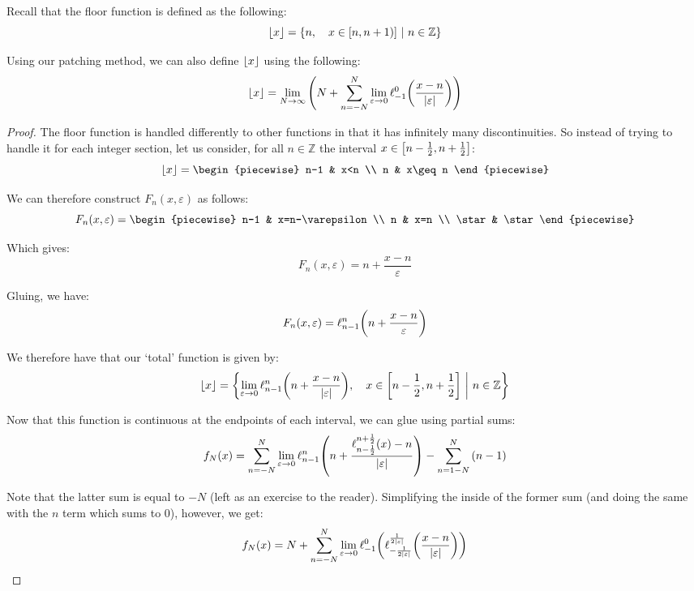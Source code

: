 \begin{example}
    Recall that the floor function is defined as the following:
    $$
        \floor{x} = \pwobj{n}{x\in[n,n+1)]}{n\in\mathbb{Z}}
    $$

    Using our patching method, we can also define $\floor{x}$ using the following:
    $$
        \floor{x} = \lim_{N\to\infty}{\paren*{N+\sum_{n=-N}^{N}{\lim_{\varepsilon\to0}{\ell_{-1}^{0}\paren*{\frac{x-n}{\abs{\varepsilon}}}}}}}
    $$

    \begin{proof}
        The floor function is handled differently to other functions in that it has infinitely many discontinuities. So instead of trying to handle it for each integer section, let us consider, for all $n\in\mathbb{Z}$ the interval $x\in\brak*{n-\frac{1}{2},n+\frac{1}{2}}$:
        $$
            \floor{x} = \begin{piecewise}
                n-1 & x<n \\
                n & x\geq n
            \end{piecewise}
        $$

        We can therefore construct $F_n(x,\varepsilon)$ as follows:
        $$
            F_n(x,\varepsilon) = \begin{piecewise}
                n-1 & x=n-\varepsilon \\
                n & x=n \\
                \star & \star
            \end{piecewise}
        $$

        Which gives:
        $$
            F_n(x,\varepsilon) = n+\frac{x-n}{\varepsilon}
        $$

        Gluing, we have:
        $$
            F_n(x,\varepsilon)= \ell_{n-1}^{n}\paren*{n+\frac{x-n}{\varepsilon}}
        $$

        We therefore have that our `total' function is given by:
        $$
            \floor{x} = \pwobj{\lim_{\varepsilon\to0}{\ell_{n-1}^{n}\paren*{n+\frac{x-n}{\abs{\varepsilon}}}}}{x\in\brak*{n-\frac{1}{2},n+\frac{1}{2}}}{n\in\mathbb{Z}}
        $$

        Now that this function is continuous at the endpoints of each interval, we can glue using partial sums:
        $$
            f_N(x) = \sum_{n=-N}^{N}{\lim_{\varepsilon\to0}{\ell_{n-1}^{n}\paren*{n+\frac{\ell_{n-\frac{1}{2}}^{n+\frac{1}{2}}(x)-n}{\abs{\varepsilon}}}}}-\sum_{n=1-N}^{N}{\paren*{n-1}}
        $$

        Note that the latter sum is equal to $-N$ (left as an exercise to the reader). Simplifying the inside of the former sum (and doing the same with the $n$ term which sums to $0$), however, we get:
        $$
            f_N(x) = N+\sum_{n=-N}^{N}{\lim_{\varepsilon\to0}{\ell_{-1}^{0}\paren*{\ell_{-\frac{1}{2\abs{\varepsilon}}}^{\frac{1}{2\abs{\varepsilon}}}\paren*{\frac{x-n}{\abs{\varepsilon}}}}}}
        $$


\end{proof}
\end{example}
